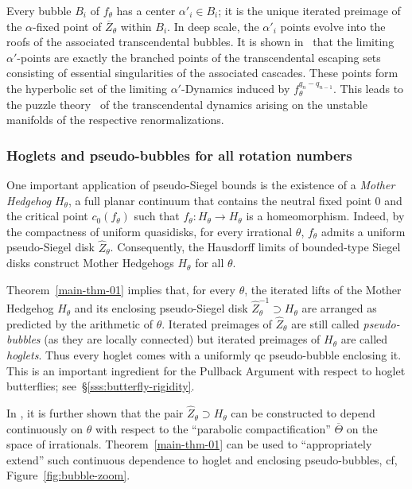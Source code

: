 \documentclass{amsart}
\begin{document}
Every bubble $B_i$ of $f_\theta$ has a center $\alpha'_i\in B_i$; it is the unique iterated preimage of the $\alpha$-fixed point of $\overline Z_\theta$ within $B_i$. In deep scale, the $\alpha'_i$ points evolve into the roofs of the associated transcendental bubbles. It is shown in~\cite[Section 5]{DL23} that the limiting $\alpha'$-points are exactly the branched points of the transcendental escaping sets consisting of essential singularities of the associated cascades. These points form the hyperbolic set of the limiting $\alpha'$-Dynamics induced by $f_{\theta}^{q_n-q_{n-1}}$. This leads to the puzzle theory~\cite{DL23} of the transcendental dynamics arising on the unstable manifolds of the respective renormalizations.

\subsubsection{Hoglets and pseudo-bubbles for all rotation numbers}
\label{sss:generalization}

One important application of pseudo-Siegel bounds is the existence of a \emph{Mother Hedgehog} $H_\theta$, a full planar continuum that contains the neutral fixed point $0$ and the critical point $c_0(f_\theta)$ such that $f_\theta : H_\theta \to H_\theta$ is a homeomorphism.
Indeed, by the compactness of uniform quasidisks, for every irrational $\theta$, $f_\theta$ admits a uniform pseudo-Siegel disk $\hat{Z}_\theta$. Consequently, the Hausdorff limits of bounded-type Siegel disks construct Mother Hedgehogs $H_\theta$ for all $\theta$.

 Theorem~\ref{main-thm-01} implies that, for every $\theta$, the iterated lifts of the Mother Hedgehog $H_\theta$ and its enclosing pseudo-Siegel disk $\hat{Z}^{-1}_\theta\supset H_\theta$ are arranged as predicted by the arithmetic of $\theta$. Iterated preimages of $\hat{Z}_{\theta}$ are still called \emph{pseudo-bubbles} (as they are locally connected) but iterated preimages of $H_\theta$ are called \emph{hoglets}. Thus every hoglet comes with a uniformly qc pseudo-bubble enclosing it. This is an important ingredient for the Pullback Argument with respect to hoglet butterflies; see~\S\ref{sss:butterfly-rigidity}.

 In \cite{DL26}, it is further shown that the pair $\hat{Z}_\theta\supset H_\theta$  can be constructed to depend continuously on $\theta$ with respect to the ``parabolic compactification'' $\overline{\Theta}$ on the space of irrationals. Theorem~\ref{main-thm-01} can be used to ``appropriately extend'' such continuous dependence to hoglet and enclosing pseudo-bubbles, cf, Figure~\ref{fig:bubble-zoom}.
\end{document}
